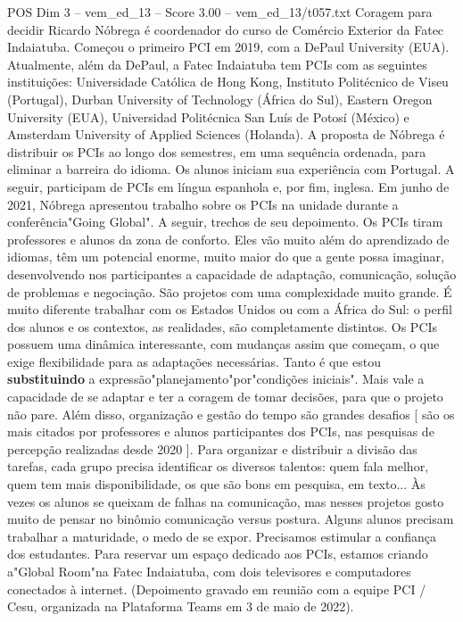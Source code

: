 \begin{textsample}{POS Dim 3 – vem\_ed\_13 – Score 3.00 – vem\_ed\_13/t057.txt}  \label{ex:f3_pos_132}
Coragem para decidir Ricardo Nóbrega é coordenador do curso de Comércio Exterior da Fatec Indaiatuba.
Começou o primeiro PCI em 2019, com a DePaul University (EUA).
Atualmente, além da DePaul, a Fatec Indaiatuba tem PCIs com as seguintes instituições: Universidade Católica de Hong Kong, Instituto Politécnico de Viseu (Portugal), Durban University of Technology (África do Sul), Eastern Oregon University (EUA), Universidad Politécnica San Luís de Potosí (México) e Amsterdam University of Applied Sciences (Holanda).
A proposta de Nóbrega é distribuir os PCIs ao longo dos semestres, em uma sequência ordenada, para eliminar a barreira do idioma.
Os alunos iniciam sua experiência com Portugal.
A seguir, participam de PCIs em língua espanhola e, por fim, inglesa.
Em junho de 2021, Nóbrega apresentou trabalho sobre os PCIs na unidade durante a conferência"Going Global".
A seguir, trechos de seu depoimento.
Os PCIs tiram professores e alunos da zona de conforto.
Eles vão muito além do aprendizado de idiomas, têm um potencial enorme, muito maior do que a gente possa imaginar, desenvolvendo nos participantes a capacidade de adaptação, comunicação, solução de problemas e negociação.
São projetos com uma complexidade muito grande.
É muito diferente trabalhar com os Estados Unidos ou com a África do Sul: o perfil dos alunos e os contextos, as realidades, são completamente distintos.
Os PCIs possuem uma dinâmica interessante, com mudanças assim que começam, o que exige flexibilidade para as adaptações necessárias.
Tanto é que estou \textbf{substituindo} a expressão"planejamento"por"condições iniciais".
Mais vale a capacidade de se adaptar e ter a coragem de tomar decisões, para que o projeto não pare.
Além disso, organização e gestão do tempo são grandes desafios [ são os mais citados por professores e alunos participantes dos PCIs, nas pesquisas de percepção realizadas desde 2020 ].
Para organizar e distribuir a divisão das tarefas, cada grupo precisa identificar os diversos talentos: quem fala melhor, quem tem mais disponibilidade, os que são bons em pesquisa, em texto... Às vezes os alunos se queixam de falhas na comunicação, mas nesses projetos gosto muito de pensar no binômio comunicação versus postura.
Alguns alunos precisam trabalhar a maturidade, o medo de se expor.
Precisamos estimular a confiança dos estudantes.
Para reservar um espaço dedicado aos PCIs, estamos criando a"Global Room"na Fatec Indaiatuba, com dois televisores e computadores conectados à internet. (Depoimento gravado em reunião com a equipe PCI / Cesu, organizada na Plataforma Teams em 3 de maio de 2022).

\end{textsample}
